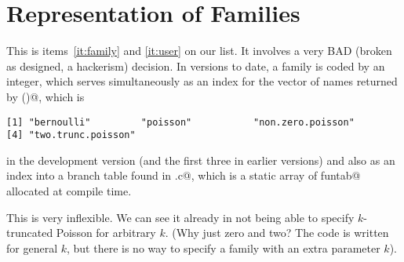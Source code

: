 \documentclass[11pt]{article}
\begin{document}
\section{Representation of Families} \label{sec:fam-one}

This is items~\ref{it:family} and \ref{it:user} on our list.
It involves a very BAD
(broken as designed, a hackerism) decision.  In versions to date,
a family is coded by an integer, which serves simultaneously as an
index for the vector of names returned by \verb@families()@, which
is
\begin{verbatim}
[1] "bernoulli"         "poisson"           "non.zero.poisson" 
[4] "two.trunc.poisson"
\end{verbatim}
in the development version (and the first three in earlier versions)
and also as an index into a branch
table \verb@myfuntab@ found in \verb@astfam.c@, which is a static array
of \verb@struct funtab@ allocated at compile time.

This is very inflexible.  We can see it already in not being able to
specify $k$-truncated Poisson for arbitrary $k$.
(Why just zero and two?  The code is written for general $k$, but there is
no way to specify a family with an extra parameter $k$).
\end{document}
